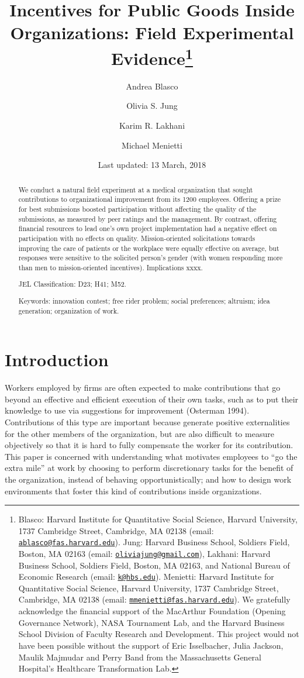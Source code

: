 \documentclass[11pt, titlepage]{article}
\title{Incentives for Public Goods Inside Organizations: Field Experimental
Evidence\thanks{Blasco: Harvard Institute for Quantitative Social Science, Harvard
University, 1737 Cambridge Street, Cambridge, MA 02138 (email:
\href{mailto:ablasco@fas.harvard.edu}{\nolinkurl{ablasco@fas.harvard.edu}}).
Jung: Harvard Business School, Soldiers Field, Boston, MA 02163 (email:
\href{mailto:oliviajung@gmail.com}{\nolinkurl{oliviajung@gmail.com}}),
Lakhani: Harvard Business School, Soldiers Field, Boston, MA 02163, and
National Bureau of Economic Research (email:
\href{mailto:k@hbs.edu}{\nolinkurl{k@hbs.edu}}). Menietti: Harvard
Institute for Quantitative Social Science, Harvard University, 1737
Cambridge Street, Cambridge, MA 02138 (email:
\href{mailto:mmenietti@fas.harvard.edu}{\nolinkurl{mmenietti@fas.harvard.edu}}).
We gratefully acknowledge the financial support of the MacArthur
Foundation (Opening Governance Network), NASA Tournament Lab, and the
Harvard Business School Division of Faculty Research and Development.
This project would not have been possible without the support of Eric
Isselbacher, Julia Jackson, Maulik Majmudar and Perry Band from the
Massachusetts General Hospital's Healthcare Transformation Lab.}}
\author{Andrea Blasco \and Olivia S. Jung \and Karim R. Lakhani \and Michael Menietti}
\date{Last updated: 13 March, 2018}
\begin{document}
\maketitle
\begin{abstract}
We conduct a natural field experiment at a medical organization that
sought contributions to organizational improvement from its 1200
employees. Offering a prize for best submissions boosted participation
without affecting the quality of the submissions, as measured by peer
ratings and the management. By contrast, offering financial resources to
lead one's own project implementation had a negative effect on
participation with no effects on quality. Mission-oriented solicitations
towards improving the care of patients or the workplace were equally
effective on average, but responses were sensitive to the solicited
person's gender (with women responding more than men to mission-oriented
incentives). Implications xxxx.

\smallskip\noindent 
JEL Classification: D23; H41; M52.

\smallskip\noindent 
Keywords: innovation contest; free rider problem; social preferences; altruism; idea generation; organization of work.
\end{abstract}


\clearpage
\tableofcontents
\setcounter{tocdepth}{2}
\clearpage

\section{Introduction}\label{introduction}

Workers employed by firms are often expected to make contributions that
go beyond an effective and efficient execution of their own tasks, such
as to put their knowledge to use via suggestions for improvement
(Osterman 1994). Contributions of this type are important because
generate positive externalities for the other members of the
organization, but are also difficult to measure objectively so that it
is hard to fully compensate the worker for its contribution. This paper
is concerned with understanding what motivates employees to ``go the
extra mile'' at work by choosing to perform discretionary tasks for the
benefit of the organization, instead of behaving opportunistically; and
how to design work environments that foster this kind of contributions
inside organizations.
\end{document}
